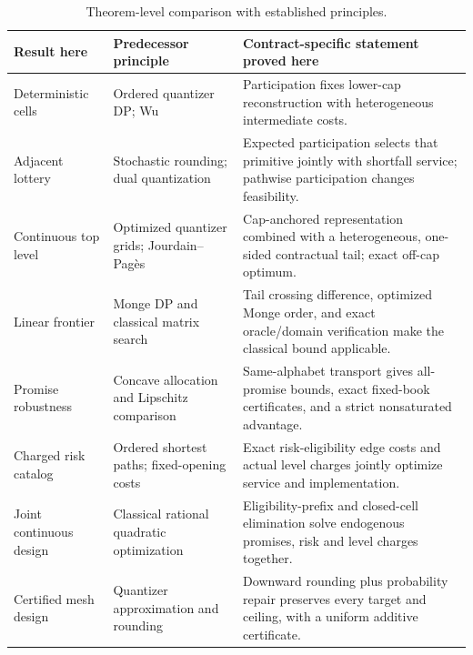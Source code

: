 \begin{table}[p]\centering
\caption{Theorem-level comparison with established principles.}\label{tab:r37-priority}
\small\begin{tabular}{p{}p{}p{}}\toprule
Result here & Predecessor principle & Contract-specific statement proved here\\\midrule
Deterministic cells & Ordered quantizer DP; Wu & Participation fixes lower-cap reconstruction with heterogeneous intermediate costs.\\[3pt]
Adjacent lottery & Stochastic rounding; dual quantization & Expected participation selects that primitive jointly with shortfall service; pathwise participation changes feasibility.\\[3pt]
Continuous top level & Optimized quantizer grids; Jourdain--Pag\`es & Cap-anchored representation combined with a heterogeneous, one-sided contractual tail; exact off-cap optimum.\\[3pt]
Linear frontier & Monge DP and classical matrix search & Tail crossing difference, optimized Monge order, and exact oracle/domain verification make the classical bound applicable.\\[3pt]
Promise robustness & Concave allocation and Lipschitz comparison & Same-alphabet transport gives all-promise bounds, exact fixed-book certificates, and a strict nonsaturated advantage.\\[3pt]
Charged risk catalog & Ordered shortest paths; fixed-opening costs & Exact risk-eligibility edge costs and actual level charges jointly optimize service and implementation.\\[3pt]
Joint continuous design & Classical rational quadratic optimization & Eligibility-prefix and closed-cell elimination solve endogenous promises, risk and level charges together.\\[3pt]
Certified mesh design & Quantizer approximation and rounding & Downward rounding plus probability repair preserves every target and ceiling, with a uniform additive certificate.\\\bottomrule
\end{tabular}
\end{table}
